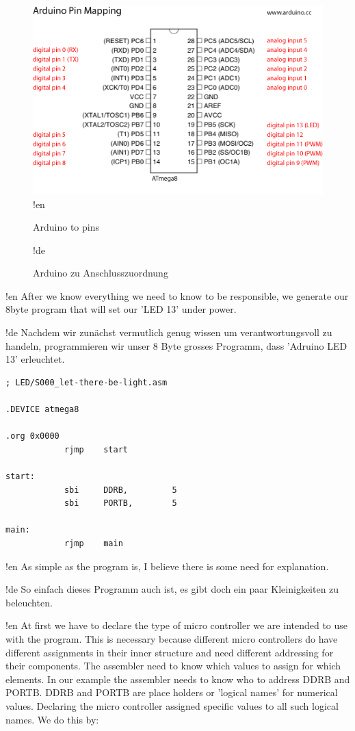 \begin{figure}[htbp]
  \centering
  \includegraphics[width=120mm]{Media/www-arduino-cc_Arduino-To-Atmega8-Pins.png}
!en   \caption{Arduino to \at  pins}
!de   \caption{Arduino zu \at  Anschlusszuordnung}
  \label{arduino-to-atmega-pins}
\end{figure}

!en After we know everything we need to know to be responsible, we generate our 8byte program that will set our 'LED 13' under power.

!de Nachdem wir zunächst vermutlich genug wissen um verantwortungsvoll zu handeln, programmieren wir unser 8 Byte grosses Programm, dass 'Adruino LED 13' erleuchtet.


\begin{lstlisting}
; LED/S000_let-there-be-light.asm

.DEVICE atmega8

.org 0x0000
            rjmp    start 

start:
            sbi     DDRB,         5
            sbi     PORTB,        5
            
main:
            rjmp    main
\end{lstlisting}

!en As simple as the program is, I believe there is some need for explanation.

!de So einfach dieses Programm auch ist, es gibt doch ein paar Kleinigkeiten zu beleuchten.



!en At first we have to declare the type of micro controller we are intended to use with the program. This is necessary because different micro controllers do have different assignments in their inner structure and need different addressing for their components. The assembler need to know which values to assign for which elements. In our example the assembler needs to know who to address DDRB and PORTB. DDRB and PORTB are place holders or 'logical names' for numerical values. Declaring the micro controller assigned specific values to all such logical names. We do this by:


